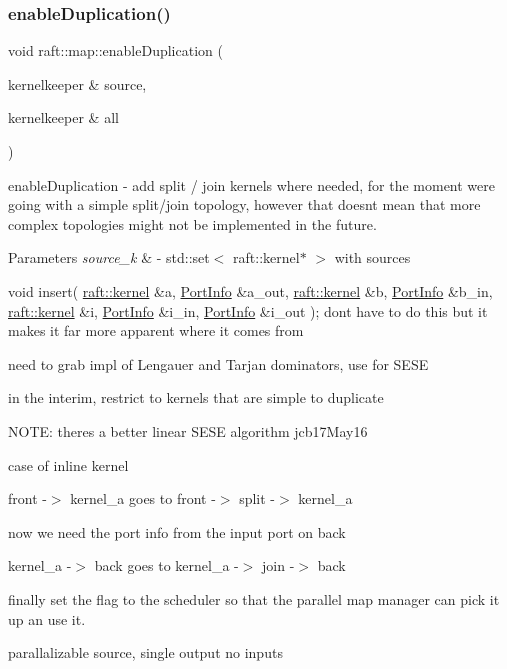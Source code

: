 \subsubsection{\texorpdfstring{enable\+Duplication()}{enableDuplication()}}
{\footnotesize\ttfamily void raft\+::map\+::enable\+Duplication (\begin{DoxyParamCaption}\item[{kernelkeeper \&}]{source,  }\item[{kernelkeeper \&}]{all }\end{DoxyParamCaption})\hspace{0.3cm}{\ttfamily [protected]}}

enable\+Duplication -\/ add split / join kernels where needed, for the moment we\textquotesingle{}re going with a simple split/join topology, however that doesn\textquotesingle{}t mean that more complex topologies might not be implemented in the future. 
\begin{DoxyParams}{Parameters}
{\em source\+\_\+k} & -\/ std\+::set$<$ raft\+::kernel$\ast$ $>$ with sources\\
\hline
\end{DoxyParams}
void insert( \hyperlink{classraft_1_1kernel}{raft\+::kernel} \&a, \hyperlink{struct_port_info}{Port\+Info} \&a\+\_\+out, \hyperlink{classraft_1_1kernel}{raft\+::kernel} \&b, \hyperlink{struct_port_info}{Port\+Info} \&b\+\_\+in, \hyperlink{classraft_1_1kernel}{raft\+::kernel} \&i, \hyperlink{struct_port_info}{Port\+Info} \&i\+\_\+in, \hyperlink{struct_port_info}{Port\+Info} \&i\+\_\+out ); don\textquotesingle{}t have to do this but it makes it far more apparent where it comes from

need to grab impl of Lengauer and Tarjan dominators, use for S\+E\+SE

in the interim, restrict to kernels that are simple to duplicate

N\+O\+TE\+: there\textquotesingle{}s a better linear S\+E\+SE algorithm jcb17\+May16

case of inline kernel

front -\/$>$ kernel\+\_\+a goes to front -\/$>$ split -\/$>$ kernel\+\_\+a

now we need the port info from the input port on back

kernel\+\_\+a -\/$>$ back goes to kernel\+\_\+a -\/$>$ join -\/$>$ back

finally set the flag to the scheduler so that the parallel map manager can pick it up an use it.

parallalizable source, single output no inputs

